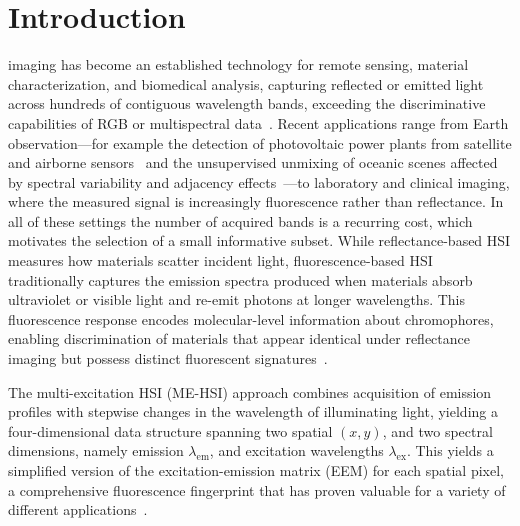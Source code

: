 \section{Introduction}
\label{sec:introduction}

 imaging has become an established technology for remote sensing, material characterization, and biomedical analysis, capturing reflected or emitted light across hundreds of contiguous wavelength bands, exceeding the discriminative capabilities of RGB or multispectral data~\cite{plaza2009recent,bioucas2013hyperspectral,hong2024spectralgpt}.
Recent applications range from Earth observation---for example the detection of photovoltaic power plants from satellite and airborne sensors~\cite{joerges2023photovoltaic} and the unsupervised unmixing of oceanic scenes affected by spectral variability and adjacency effects~\cite{deville2023oceanic}---to laboratory and clinical imaging, where the measured signal is increasingly fluorescence rather than reflectance.
In all of these settings the number of acquired bands is a recurring cost, which motivates the selection of a small informative subset.
While reflectance-based HSI measures how materials scatter
incident light, fluorescence-based HSI traditionally captures the emission spectra produced when materials absorb ultraviolet or visible light and re-emit photons at longer wavelengths.
This fluorescence response encodes molecular-level information about chromophores, enabling discrimination of materials that appear identical under reflectance imaging but possess distinct fluorescent signatures~\cite{muselimyan2016,gil2017}.

The multi-excitation HSI (ME-HSI) approach combines
acquisition of emission profiles with stepwise changes in the
wavelength of illuminating light, yielding a four-dimensional data structure spanning two spatial $(x, y)$, and two spectral dimensions, namely emission $\lambda_{\text{em}}$, and excitation wavelengths $\lambda_{\text{ex}}$.
This yields a simplified version of the excitation-emission matrix (EEM) for each spatial pixel, a comprehensive fluorescence fingerprint that has proven valuable for a variety of different applications~\cite{lakowicz2006principles,swift2018}.

